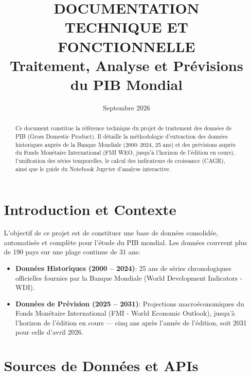 \documentclass[11pt,a4paper]{article}
\title{\textbf{DOCUMENTATION TECHNIQUE ET FONCTIONNELLE}\\[0.5em]
\Large Traitement, Analyse et Prévisions du PIB Mondial}
\author{}
\date{Septembre 2026}
\begin{document}
\maketitle

\begin{abstract}
Ce document constitue la référence technique du projet de traitement des données de PIB (Gross Domestic Product). Il détaille la méthodologie d'extraction des données historiques auprès de la Banque Mondiale (2000--2024, 25 ans) et des prévisions auprès du Fonds Monétaire International (FMI WEO, jusqu'à l'horizon de l'édition en cours), l'unification des séries temporelles, le calcul des indicateurs de croissance (CAGR), ainsi que le guide du Notebook Jupyter d'analyse interactive.
\end{abstract}

\tableofcontents
\newpage

\section{Introduction et Contexte}
L'objectif de ce projet est de constituer une base de données consolidée, automatisée et complète pour l'étude du PIB mondial. Les données couvrent plus de 190 pays sur une plage continue de 31 ans:
\begin{itemize}
    \item \textbf{Données Historiques (2000 -- 2024)}: 25 ans de séries chronologiques officielles fournies par la Banque Mondiale (World Development Indicators - WDI).
    \item \textbf{Données de Prévision (2025 -- 2031)}: Projections macroéconomiques du Fonds Monétaire International (FMI - World Economic Outlook), jusqu'à l'horizon de l'édition en cours --- cinq ans après l'année de l'édition, soit 2031 pour celle d'avril 2026.
\end{itemize}

\section{Sources de Données et APIs}
\end{document}
